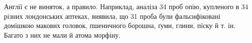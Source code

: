 Англії є не виняток, а правило. Наприклад, аналіза 34 проб опію, купленого
в 34 різних лондонських аптеках, виявила, що 31 проба були фальсифіковані
домішкою макових головок, пшеничного борошна, ґуми,
глини, піску й т. ін. Багато з них не мали й атома морфіну.
\parbreak{}  %
